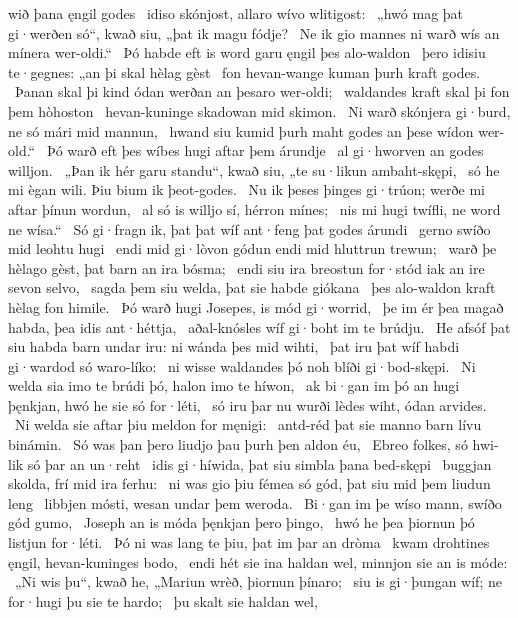 wið þana ęngil godes \hld\ idiso skónjost,
allaro wívo wlitigost: \hld\ „hwó mag þat gi·werðen só“, kwað siu,
„þat ik magu fódje? \hld\ Ne ik gio mannes ni warð
wís an mínera wer-oldi.“ \hld\ Þó habde eft is word garu
ęngil þes alo-waldon \hld\ þero idisiu te·gegnes:
„an þi skal hèlag gèst \hld\ fon hevan-wange
kuman þurh kraft godes. \hld\ Þanan skal þi kind ódan
werðan an þesaro wer-oldi; \hld\ waldandes kraft
skal þi fon þem hòhoston \hld\ hevan-kuninge
skadowan mid skimon. \hld\ Ni warð skónjera gi·burd,
ne só mári mid mannun, \hld\ hwand siu kumid þurh maht godes
an þese wídon wer-old.“ \hld\ Þó warð eft þes wíbes hugi
aftar þem árundje \hld\ al gi·hworven
an godes willjon. \hld\ „Þan ik hér garu standu“, kwað siu,
„te su·likun ambaht-skępi, \hld\ só he mi ègan wili.
Þiu bium ik þeot-godes. \hld\ Nu ik þeses þinges gi·trúon;
werðe mi aftar þínun wordun, \hld\ al só is willjo sí,
hérron mínes; \hld\ nis mi hugi twífli,
ne word ne wísa.“ \hld\ Só gi·fragn ik, þat þat wíf ant·feng
þat godes árundi \hld\ gerno swíðo
mid leohtu hugi \hld\ endi mid gi·lòvon gódun
endi mid hluttrun trewun; \hld\ warð þe hèlago gèst,
þat barn an ira bósma; \hld\ endi siu ira breostun for·stód
iak an ire sevon selvo, \hld\ sagda þem siu welda,
þat sie habde giókana \hld\ þes alo-waldon kraft
hèlag fon himile. \hld\ Þó warð hugi Josepes,
is mód gi·worrid, \hld\ þe im ér þea magað habda,
þea idis ant·héttja, \hld\ aðal-knósles wíf
gi·boht im te brúdju. \hld\ He afsóf þat siu habda barn undar iru:
ni wánda þes mid wihti, \hld\ þat iru þat wíf habdi
gi·wardod só waro-líko: \hld\ ni wisse waldandes þó noh
blíði gi·bod-skępi. \hld\ Ni welda sia imo te brúdi þó,
halon imo te híwon, \hld\ ak bi·gan im þó an hugi þęnkjan,
hwó he sie só for·léti, \hld\ só iru þar nu wurði lèdes wiht,
ódan arvides. \hld\ Ni welda sie aftar þiu
meldon for męnigi: \hld\ antd-réd þat sie manno barn
lívu binámin. \hld\ Só was þan þero liudjo þau
þurh þen aldon éu, \hld\ Ebreo folkes,
só hwi-lik só þar an un·reht \hld\ idis gi·híwida,
þat siu simbla þana bed-skępi \hld\ buggjan skolda,
frí mid ira ferhu: \hld\ ni was gio þiu fémea só gód,
þat siu mid þem liudun leng \hld\ libbjen mósti,
wesan undar þem weroda. \hld\ Bi·gan im þe wíso mann,
swíðo gód gumo, \hld\ Joseph an is móda
þęnkjan þero þingo, \hld\ hwó he þea þiornun þó
listjun for·léti. \hld\ Þó ni was lang te þiu,
þat im þar an dròma \hld\ kwam drohtines ęngil,
hevan-kuninges bodo, \hld\ endi hét sie ina haldan wel,
minnjon sie an is móde: \hld\ „Ni wis þu“, kwað he, „Mariun wrèð,
þiornun þínaro; \hld\ siu is gi·þungan wíf;
ne for·hugi þu sie te hardo; \hld\ þu skalt sie haldan wel,
